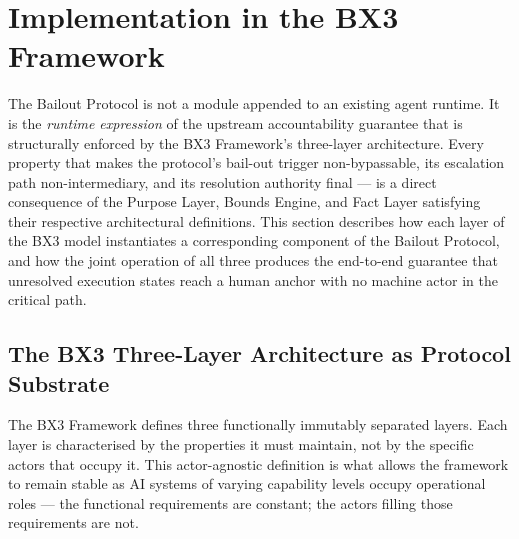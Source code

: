 \section{Implementation in the BX3 Framework}
\label{sec:implementation}

The Bailout Protocol is not a module appended to an existing agent runtime. It is the \textit{runtime expression} of the upstream accountability guarantee that is structurally enforced by the BX3 Framework's three-layer architecture. Every property that makes the protocol's bail-out trigger non-bypassable, its escalation path non-intermediary, and its resolution authority final — is a direct consequence of the Purpose Layer, Bounds Engine, and Fact Layer satisfying their respective architectural definitions. This section describes how each layer of the BX3 model instantiates a corresponding component of the Bailout Protocol, and how the joint operation of all three produces the end-to-end guarantee that unresolved execution states reach a human anchor with no machine actor in the critical path.

\subsection{The BX3 Three-Layer Architecture as Protocol Substrate}
\label{sec:bx3-layers}

The BX3 Framework defines three functionally immutably separated layers. Each layer is characterised by the properties it must maintain, not by the specific actors that occupy it. This actor-agnostic definition is what allows the framework to remain stable as AI systems of varying capability levels occupy operational roles — the functional requirements are constant; the actors filling those requirements are not.

